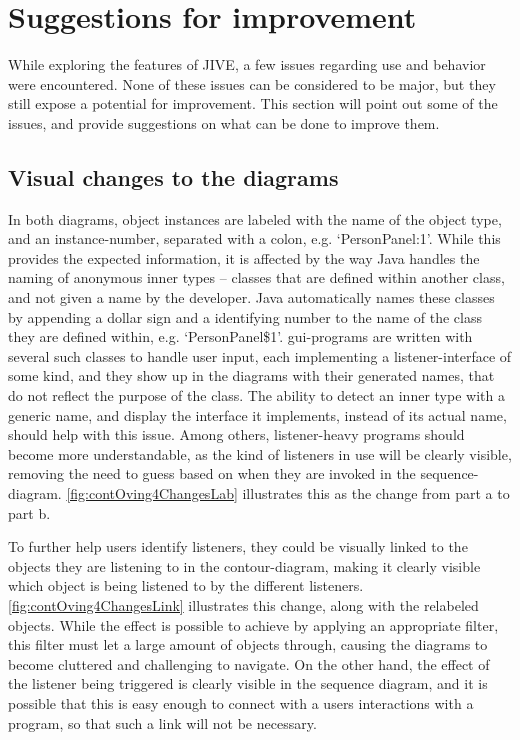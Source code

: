 \section{Suggestions for improvement}\label{jiveSuggestions}

While exploring the features of JIVE, a few issues regarding use and behavior were encountered.
None of these issues can be considered to be major, but they still expose a potential for improvement.
This section will point out some of the issues, and provide suggestions on what can be done to improve them.


\subsection{Visual changes to the diagrams}\label{jiveSuggestionsVisual}
In both diagrams, object instances are labeled with the name of the object type, and an instance-number, separated with a colon, e.g. `PersonPanel:1'.
While this provides the expected information, it is affected by the way Java handles the naming of anonymous inner types -- classes that are defined within another class, and not given a name by the developer.
Java automatically names these classes by appending a dollar sign and a identifying number to the name of the class they are defined within, e.g. `PersonPanel\$1'.
\gls{gui}-programs are written with several such classes to handle user input, each implementing a listener-interface of some kind, and they show up in the diagrams with their generated names, that do not reflect the purpose of the class.
The ability to detect an inner type with a generic name, and display the interface it implements, instead of its actual name, should help with this issue.
Among others, listener-heavy programs should become more understandable, as the kind of listeners in use will be clearly visible, removing the need to guess based on when they are invoked in the sequence-diagram.
\autoref{fig:contOving4ChangesLab} illustrates this as the change from part a to part b.


To further help users identify listeners, they could be visually linked to the objects they are listening to in the contour-diagram, making it clearly visible which object is being listened to by the different listeners.
\autoref{fig:contOving4ChangesLink} illustrates this change, along with the relabeled objects.
While the effect is possible to achieve by applying an appropriate filter, this filter must let a large amount of objects through, causing the diagrams to become cluttered and challenging to navigate.
On the other hand, the effect of the listener being triggered is clearly visible in the sequence diagram, and it is possible that this is easy enough to connect with a users interactions with a program, so that such a link will not be necessary.


